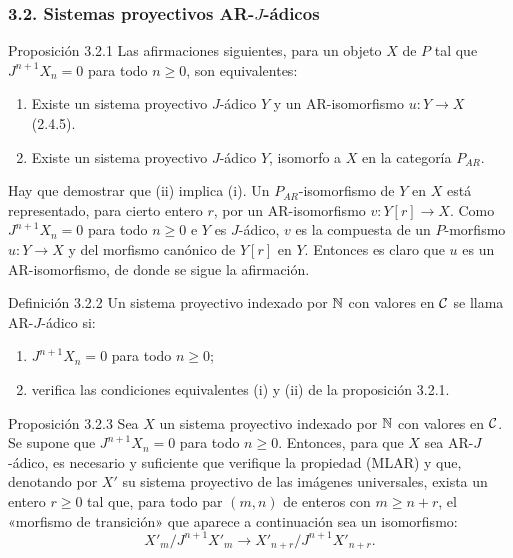 \subsubsection*{3.2. Sistemas proyectivos AR-$J$-ádicos}
\begin{statement}{Proposición 3.2.1}
Las afirmaciones siguientes, para un objeto $X$ de $P$ tal que $J^{n+1}X_n=0$ para todo $n\ge0$, son equivalentes:
\begin{enumerate}[label=(\roman*)]
\item Existe un sistema proyectivo $J$-ádico $Y$ y un AR-isomorfismo $u:Y\to X$ (2.4.5).
\item Existe un sistema proyectivo $J$-ádico $Y$, isomorfo a $X$ en la categoría $P_{AR}$.
\end{enumerate}
\end{statement}

\begin{prooftext}[Demostración]
Hay que demostrar que (ii) implica (i). Un $P_{AR}$-isomorfismo de $Y$ en $X$ está representado, para cierto entero $r$, por un AR-isomorfismo $v:Y[r]\to X$. Como $J^{n+1}X_n=0$ para todo $n\ge0$ e $Y$ es $J$-ádico, $v$ es la compuesta de un $P$-morfismo $u:Y\to X$ y del morfismo canónico de $Y[r]$ en $Y$. Entonces es claro que $u$ es un AR-isomorfismo, de donde se sigue la afirmación.
\end{prooftext}

\begin{statement}{Definición 3.2.2}
Un sistema proyectivo indexado por $\mathbb N$ con valores en $\mathcal C$ se llama AR-$J$-ádico si:
\begin{enumerate}[label=(\alph*)]
\item $J^{n+1}X_n=0$ para todo $n\ge0$;
\item verifica las condiciones equivalentes (i) y (ii) de la proposición 3.2.1.
\end{enumerate}
\end{statement}

\begin{statement}{Proposición 3.2.3}
Sea $X$ un sistema proyectivo indexado por $\mathbb N$ con valores en $\mathcal C$. Se supone que $J^{n+1}X_n=0$ para todo $n\ge0$. Entonces, para que $X$ sea AR-$J$-ádico, es necesario y suficiente que verifique la propiedad (MLAR) y que, denotando por $X'$ su sistema proyectivo de las imágenes universales, exista un entero $r\ge0$ tal que, para todo par $(m,n)$ de enteros con $m\ge n+r$, el «morfismo de transición» que aparece a continuación sea un isomorfismo:
\[
X'_m/J^{n+1}X'_m\longrightarrow X'_{n+r}/J^{n+1}X'_{n+r}.
\]
\end{statement}
